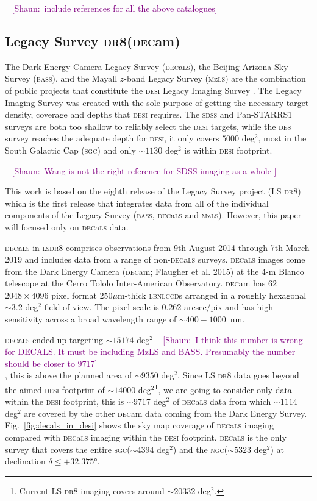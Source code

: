 \documentclass[fleqn,usenatbib]{mnras}
\newcommand{\shaun}[1]{~\newline\noindent \textcolor{Purple}{{ [Shaun:~{#1}]\\}}}
\newcommand{\BASS}{\textsc{bass}\xspace}
\newcommand{\CCDs}{\textsc{ccd}s\xspace}
\newcommand{\DECam}{\textsc{dec}am\xspace}
\newcommand{\DECaLS}{\textsc{dec}a\textsc{ls}\xspace}
\newcommand{\DESI}{\textsc{desi}\xspace}
\newcommand{\DES}{\textsc{des}\xspace}
\newcommand{\DReight}{\textsc{dr8}\xspace}
\newcommand{\LBNL}{\textsc{lbnl}\xspace}
\newcommand{\LS}{\textsc{ls}\xspace}
\newcommand{\MzLS}{\textsc{m}z\textsc{ls}\xspace}
\newcommand{\NGC}{\textsc{ngc}\xspace}
\newcommand{\SDSS}{\textsc{sdss}\xspace}
\newcommand{\SGC}{\textsc{sgc}\xspace}
\newcommand{\PS}{\textsc{ps}1\xspace}
\begin{document}
\shaun{include references for all the above catalogues} 


\subsection{Legacy Survey \DReight (\DECam)}


The Dark Energy Camera Legacy Survey (\DECaLS), the Beijing-Arizona Sky Survey (\BASS), and the Mayall $z$-band Legacy Survey (\textsc{m}z\textsc{ls}) are the combination of public projects that constitute the \DESI Legacy Imaging Survey  \citep[hereafter the Legacy Survey][]{2019AJ....157..168D}. The Legacy Imaging Survey was created with the sole purpose of getting the necessary target density, coverage and depths that \DESI requires. The \SDSS \citep{Wang:2013noa} and Pan-STARRS1 \citep[\PS][]{2016arXiv161205560C} 
surveys are both too shallow to reliably select the \DESI targets, while the \DES survey \citep{Abbott:2005bi} reaches the adequate depth for \DESI, it only covers $5000$ deg$^2$, most in the South Galactic Cap (\SGC) and only $\sim 1130$ deg$^2$ is within \DESI footprint.


\shaun{Wang is not the right reference for SDSS imaging as a whole } 

This work is based on the eighth release of the Legacy Survey project (LS \DReight) which is the first release that integrates data from all of the individual components of the Legacy Survey (\BASS, \DECaLS and \MzLS). However, this paper will focused only on \DECaLS data.

\DECaLS in \LS \DReight comprises observations from 9th August 2014 through 7th March 2019 and includes data from a range of non-\DECaLS surveys. \DECaLS images come from the Dark Energy Camera (\DECam; Flaugher et al. 2015) at the 4-m Blanco telescope at the Cerro Tololo Inter-American Observatory. \DECam has $62$ $2048\times 4096$ pixel format $250 \mu$m-thick \LBNL \CCDs arranged in a roughly hexagonal $\sim 3.2$ deg$^2$ field of view. The pixel scale is $0.262$ arcsec/pix and has high sensitivity across a broad wavelength range of $\sim 400-1000$~nm. 

\DECaLS ended up targeting $\sim 15174$ deg$^2$ \shaun{I think this number is wrong for DECALS. It must be including MzLS and BASS. Presumably the number should be closer to 9717}
, this is above the planned area of $\sim 9350$ deg$^2$\citep{2019AJ....157..168D}. Since LS \DReight data goes beyond the aimed \DESI footprint of $\sim 14000$ deg$^2$\footnote{Current LS \DReight imaging covers around $\sim 20332$ deg$^2$.}, we are going to consider only data within the \DESI footprint, this is $\sim 9717$ deg$^2$ of \DECaLS data from which $\sim 1114$ deg$^2$ are covered by the other \DECam data coming from the Dark Energy Survey\citep[\DES,][]{Abbott:2005bi}. Fig.~\ref{fig:decals_in_desi} shows the sky map coverage of \DECaLS imaging compared with \DECaLS imaging within the \DESI footprint. \DECaLS is the only survey that covers the entire \SGC ($\sim 4394$ deg$^2$) and the \NGC ($\sim 5323$ deg$^2$) at declination $\delta \leq +\ang{32.375}$. 
\end{document}

